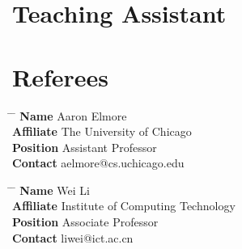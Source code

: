 \documentclass[10pt]{article} %
\begin{document}
\section{Teaching Assistant}

\vspace{-5mm}





\section{Referees}

\parbox{0.5\textwidth}{ %
\begin{tabbing}
\hspace{1.5cm} \= \hspace{4cm} \= \kill %
{\bf Name} \> Aaron Elmore \\ %
{\bf Affiliate} \> The University of Chicago \\ %
{\bf Position} \> Assistant Professor \\ %
{\bf Contact} \> aelmore@cs.uchicago.edu %
\end{tabbing}}
\hfill %
\parbox{0.5\textwidth}{ %
\begin{tabbing}
\hspace{1.5cm} \= \hspace{4cm} \= \kill %
{\bf Name} \> Wei Li\\ %
{\bf Affiliate} \> Institute of Computing Technology \\ %
{\bf Position} \> Associate Professor \\ %
{\bf Contact} \> liwei@ict.ac.cn %
\end{tabbing}} 


\end{document}
